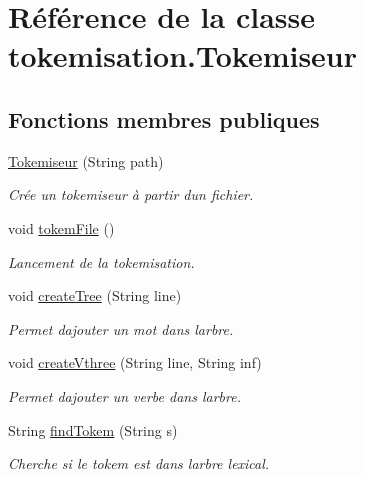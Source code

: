 \hypertarget{classtokemisation_1_1_tokemiseur}{}\section{Référence de la classe tokemisation.\+Tokemiseur}
\label{classtokemisation_1_1_tokemiseur}
\subsection*{Fonctions membres publiques}
\begin{DoxyCompactItemize}
\item 
\hyperlink{classtokemisation_1_1_tokemiseur_a0bedd0f61434a9597b87c674a52af8bf}{Tokemiseur} (String path)
\begin{DoxyCompactList}\small\item\em Crée un tokemiseur à partir d\textquotesingle{}un fichier. \end{DoxyCompactList}\item 
void \hyperlink{classtokemisation_1_1_tokemiseur_a1036e3bd17f10ac37b00142119495307}{tokem\+File} ()\hypertarget{classtokemisation_1_1_tokemiseur_a1036e3bd17f10ac37b00142119495307}{}\label{classtokemisation_1_1_tokemiseur_a1036e3bd17f10ac37b00142119495307}

\begin{DoxyCompactList}\small\item\em Lancement de la tokemisation. \end{DoxyCompactList}\item 
void \hyperlink{classtokemisation_1_1_tokemiseur_a9af268b22fd743447b689a27e0b0db3a}{create\+Tree} (String line)
\begin{DoxyCompactList}\small\item\em Permet d\textquotesingle{}ajouter un mot dans l\textquotesingle{}arbre. \end{DoxyCompactList}\item 
void \hyperlink{classtokemisation_1_1_tokemiseur_ae932be66d27c705438bb7e07036c2f52}{create\+Vthree} (String line, String inf)
\begin{DoxyCompactList}\small\item\em Permet d\textquotesingle{}ajouter un verbe dans l\textquotesingle{}arbre. \end{DoxyCompactList}\item 
String \hyperlink{classtokemisation_1_1_tokemiseur_a9aa1bbf145517a2b9b79461d8d831145}{find\+Tokem} (String s)
\begin{DoxyCompactList}\small\item\em Cherche si le tokem est dans l\textquotesingle{}arbre lexical. \end{DoxyCompactList}\end{DoxyCompactItemize}


